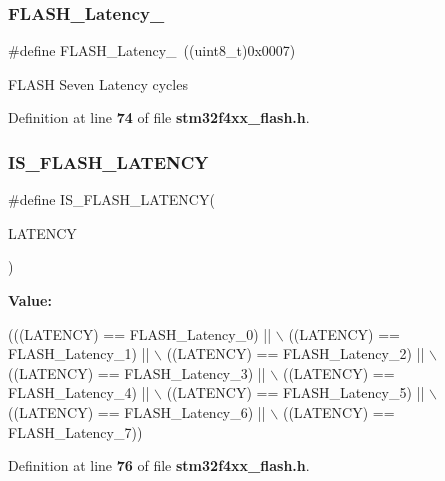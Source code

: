 \mbox{\label{group__Flash__Latency_ga352a374f6ae41d2cae767ed95efc6ae5}} 
\subsubsection{F\+L\+A\+S\+H\+\_\+\+Latency\+\_}
{\footnotesize\ttfamily \#define F\+L\+A\+S\+H\+\_\+\+Latency\+\_~((uint8\+\_\+t)0x0007)}

F\+L\+A\+SH Seven Latency cycles 

Definition at line \textbf{ 74} of file \textbf{ stm32f4xx\+\_\+flash.\+h}.

\mbox{\label{group__Flash__Latency_gafcbd098d482318a622a58bf168547389}} 
\subsubsection{I\+S\+\_\+\+F\+L\+A\+S\+H\+\_\+\+L\+A\+T\+E\+N\+CY}
{\footnotesize\ttfamily \#define I\+S\+\_\+\+F\+L\+A\+S\+H\+\_\+\+L\+A\+T\+E\+N\+CY(\begin{DoxyParamCaption}\item[{}]{L\+A\+T\+E\+N\+CY }\end{DoxyParamCaption})}

{\bfseries Value\+:}
\begin{DoxyCode}
(((LATENCY) == FLASH_Latency_0) || \(\backslash\)
                                   ((LATENCY) == FLASH_Latency_1) || \(\backslash\)
                                   ((LATENCY) == FLASH_Latency_2) || \(\backslash\)
                                   ((LATENCY) == FLASH_Latency_3) || \(\backslash\)
                                   ((LATENCY) == FLASH_Latency_4) || \(\backslash\)
                                   ((LATENCY) == FLASH_Latency_5) || \(\backslash\)
                                   ((LATENCY) == FLASH_Latency_6) || \(\backslash\)
                                   ((LATENCY) == FLASH_Latency_7))
\end{DoxyCode}


Definition at line \textbf{ 76} of file \textbf{ stm32f4xx\+\_\+flash.\+h}.

